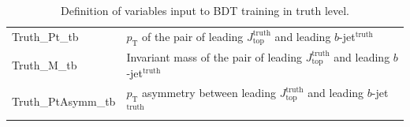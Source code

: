 \begin{table}[H]
\begin{tabular*}{150mm}{@{\extracolsep{\fill}}ll}
    Truth\_Pt\_tb              & $p_\text{T}$ of the pair of leading $J_{\text{top}}^{\text{truth}}$ and leading $b$-jet$^{\text{truth}}$\\
    Truth\_M\_tb               & Invariant mass of the pair of leading $J_{\text{top}}^{\text{truth}}$ and leading $b$-jet$^{\text{truth}}$\\
    Truth\_PtAsymm\_tb         & $p_\text{T}$ asymmetry between leading $J_{\text{top}}^{\text{truth}}$ and leading $b$-jet$^{\text{truth}}$\\
    \hline
  \end{tabular*}
  \caption{Definition of variables input to BDT training in truth level.}
  \label{tab:BDTInputVariablesInTruthLevel}
\end{table}


\begin{figure}[H]
\end{figure}
